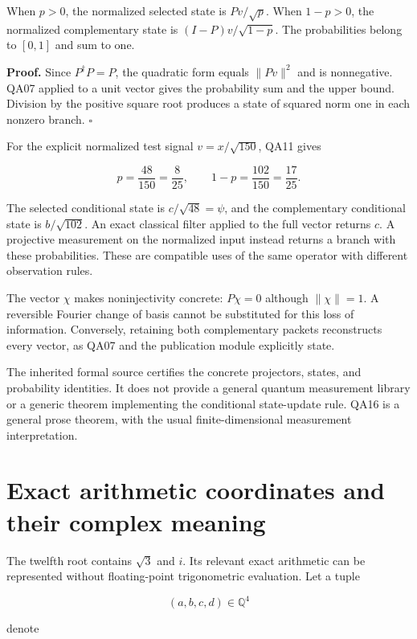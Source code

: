 When \(p>0\), the normalized selected state is \(Pv/\sqrt p\). When
\(1-p>0\), the normalized complementary state is \((I-P)v/\sqrt{1-p}\).
The probabilities belong to \([0,1]\) and sum to one.

\textbf{Proof.} Since \(P^\dagger P=P\), the quadratic form equals
\(\|Pv\|^2\) and is nonnegative. QA07 applied to a unit vector gives the
probability sum and the upper bound. Division by the positive square
root produces a state of squared norm one in each nonzero branch.
\(\square\)

For the explicit normalized test signal \(v=x/\sqrt{150}\), QA11 gives

\[
p=\frac{48}{150}=\frac8{25},
\qquad 1-p=\frac{102}{150}=\frac{17}{25}.
\]

The selected conditional state is \(c/\sqrt{48}=\psi\), and the
complementary conditional state is \(b/\sqrt{102}\). An exact classical
filter applied to the full vector returns \(c\). A projective
measurement on the normalized input instead returns a branch with these
probabilities. These are compatible uses of the same operator with
different observation rules.

The vector \(\chi\) makes noninjectivity concrete: \(P\chi=0\) although
\(\|\chi\|=1\). A reversible Fourier change of basis cannot be
substituted for this loss of information. Conversely, retaining both
complementary packets reconstructs every vector, as QA07 and the
publication module explicitly state.

The inherited formal source certifies the concrete projectors, states,
and probability identities. It does not provide a general quantum
measurement library or a generic theorem implementing the conditional
state-update rule. QA16 is a general prose theorem, with the usual
finite-dimensional measurement interpretation.

\hypertarget{q:exact-arithmetic-coordinates-and-their-complex-meaning}{%
\section{Exact arithmetic coordinates and their complex
meaning}\label{q:exact-arithmetic-coordinates-and-their-complex-meaning}}

The twelfth root contains \(\sqrt3\) and \(i\). Its relevant exact
arithmetic can be represented without floating-point trigonometric
evaluation. Let a tuple

\[
(a,b,c,d)\in\mathbb Q^4
\]

denote

